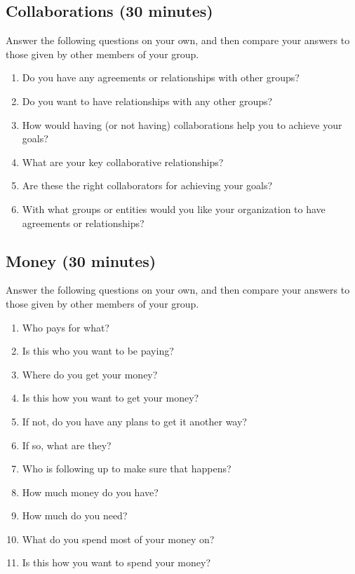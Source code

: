 \documentclass[10pt,statementpaper]{memoir}
\providecommand{\tightlist}{%
  \setlength{\itemsep}{0pt}\setlength{\parskip}{0pt}}
\begin{document}
\subsection{Collaborations (30
minutes)}\label{collaborations-30-minutes}

Answer the following questions on your own, and then compare your
answers to those given by other members of your group.

\begin{enumerate}
\def\labelenumi{\arabic{enumi}.}
\tightlist
\item
  Do you have any agreements or relationships with other groups?
\item
  Do you want to have relationships with any other groups?
\item
  How would having (or not having) collaborations help you to achieve
  your goals?
\item
  What are your key collaborative relationships?
\item
  Are these the right collaborators for achieving your goals?
\item
  With what groups or entities would you like your organization to have
  agreements or relationships?
\end{enumerate}

\subsection{Money (30 minutes)}\label{money-30-minutes}

Answer the following questions on your own, and then compare your
answers to those given by other members of your group.

\begin{enumerate}
\def\labelenumi{\arabic{enumi}.}
\tightlist
\item
  Who pays for what?
\item
  Is this who you want to be paying?
\item
  Where do you get your money?
\item
  Is this how you want to get your money?
\item
  If not, do you have any plans to get it another way?
\item
  If so, what are they?
\item
  Who is following up to make sure that happens?
\item
  How much money do you have?
\item
  How much do you need?
\item
  What do you spend most of your money on?
\item
  Is this how you want to spend your money?
\end{enumerate}
\end{document}
